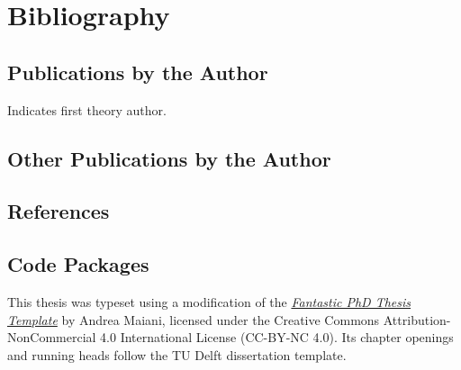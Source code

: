 \documentclass[twoside, 10pt]{memoir}
\begin{document}
\chapter*[Bibliography]{Bibliography}
\section*{Publications by the Author}
\thesisSuperscript{*} Indicates first theory author.
\newrefcontext[labelprefix=P,sorting=oldestfirst]
\printbibliography[check=pubsin, heading=none, resetnumbers=true]
\section*{Other Publications by the Author}
\newrefcontext[labelprefix=N,sorting=oldestfirst]
\printbibliography[check=pubsnotin, heading=none, resetnumbers=true]
\section*{References}
\newrefcontext[labelprefix=]
\printbibliography[check=mainbib, heading=none, resetnumbers=true]
\section*{Code Packages}
\newrefcontext[labelprefix=C]
\printbibliography[check=codepkg, heading=none, resetnumbers=true]

\begin{disclaimer}
    This thesis was typeset using a modification of the \href{https://github.com/maiani/fantastic_template}{\textit{Fantastic PhD Thesis Template}} by Andrea Maiani, licensed under the Creative Commons Attribution-NonCommercial 4.0 International License (CC-BY-NC 4.0).
    Its chapter openings and running heads follow the TU Delft dissertation template.
\end{disclaimer}



\end{document}
